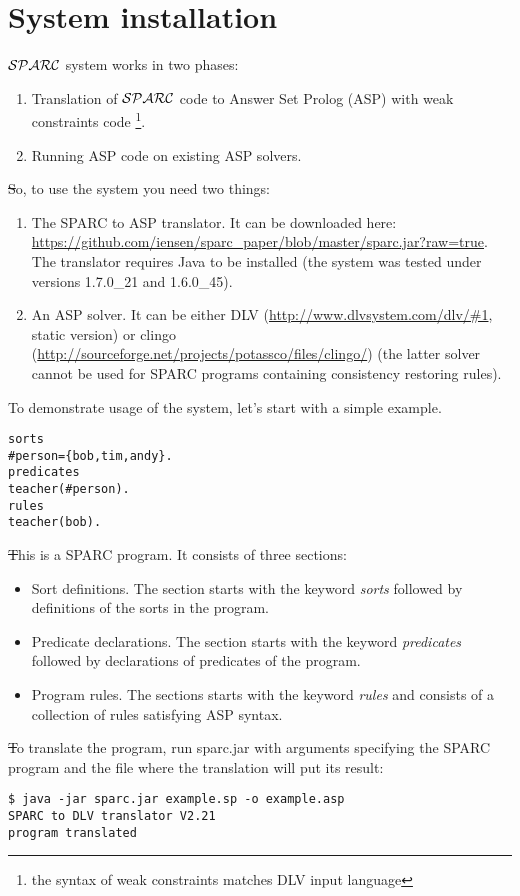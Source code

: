 \documentclass[12pt, letterpaper]{article}
\begin{document}
\section{System installation}
${\cal SPARC}$ system  works in two phases:
\begin{enumerate}
\item Translation of ${\cal SPARC}$ code to Answer Set Prolog (ASP) with weak constraints\cite{buccafurri1997strong} code 
\footnote{the syntax of weak constraints matches DLV input language}.
\item Running ASP code on existing ASP solvers.
\end{enumerate}

\st So, to use the system you need two things:
\begin{enumerate}
\item The SPARC to ASP translator. It can be downloaded here: \url{https://github.com/iensen/sparc_paper/blob/master/sparc.jar?raw=true}.
The translator requires Java to be installed (the system was tested under versions 1.7.0\_21 and 1.6.0\_45).
\item An ASP solver. It can be either DLV (\url{http://www.dlvsystem.com/dlv/#1}, static version) or clingo (\url{http://sourceforge.net/projects/potassco/files/clingo/}) (the latter solver cannot be used for SPARC programs containing consistency restoring rules).
\end{enumerate}

To demonstrate usage of the system, let's start with a simple example.
\begin{verbatim}
sorts
#person={bob,tim,andy}.
predicates
teacher(#person).
rules
teacher(bob).
\end{verbatim}

\st This is a SPARC program. It consists of three sections:
\begin{itemize}
 \item Sort definitions. The section starts with the keyword \textit{sorts} followed by definitions of the sorts in the program.
 \item Predicate declarations. The section starts with the keyword \textit{predicates} followed by declarations of predicates of the program.
 \item Program rules. The sections starts with the keyword \textit{rules}  and consists of a collection of rules satisfying ASP syntax.
\end{itemize}

\st To translate the program, run sparc.jar with arguments specifying the SPARC program and the file where the translation will put its result:
\begin{verbatim}
$ java -jar sparc.jar example.sp -o example.asp
SPARC to DLV translator V2.21
program translated
\end{verbatim}
\end{document}
